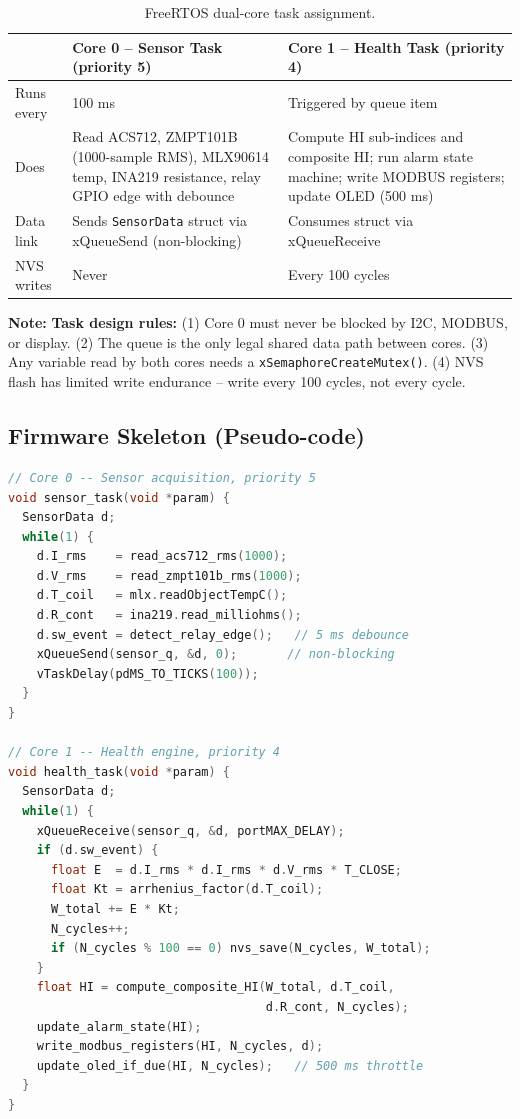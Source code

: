 \documentclass[12pt,a4paper]{article}
\newenvironment{notebox}{%
  \begin{mdframed}[backgroundcolor=notebg,linecolor=noteln,linewidth=1.5pt,
    innerleftmargin=9pt,innerrightmargin=9pt,innertopmargin=5pt,innerbottommargin=5pt]
  \textbf{\color{noteln}Note: }}{\end{mdframed}}
\begin{document}
\begin{table}[H]
\centering
\begin{tabularx}{\textwidth}{lXX}
\toprule
 & \textbf{Core 0 -- Sensor Task (priority 5)} & \textbf{Core 1 -- Health Task (priority 4)} \\
\midrule
Runs every & 100 ms & Triggered by queue item \\
Does & Read ACS712, ZMPT101B (1000-sample RMS), MLX90614 temp, INA219 resistance, relay GPIO edge with debounce & Compute HI sub-indices and composite HI; run alarm state machine; write MODBUS registers; update OLED (500 ms) \\
Data link & Sends \texttt{SensorData} struct via xQueueSend (non-blocking) & Consumes struct via xQueueReceive \\
NVS writes & Never & Every 100 cycles \\
\bottomrule
\end{tabularx}
\caption{FreeRTOS dual-core task assignment.}
\end{table}

\begin{notebox}
\textbf{Task design rules:}
(1) Core 0 must never be blocked by I2C, MODBUS, or display.
(2) The queue is the only legal shared data path between cores.
(3) Any variable read by both cores needs a \texttt{xSemaphoreCreateMutex()}.
(4) NVS flash has limited write endurance -- write every 100 cycles, not every cycle.
\end{notebox}

\subsection{Firmware Skeleton (Pseudo-code)}

\begin{lstlisting}[language=C, caption={FreeRTOS firmware structure.}]
// Core 0 -- Sensor acquisition, priority 5
void sensor_task(void *param) {
  SensorData d;
  while(1) {
    d.I_rms    = read_acs712_rms(1000);
    d.V_rms    = read_zmpt101b_rms(1000);
    d.T_coil   = mlx.readObjectTempC();
    d.R_cont   = ina219.read_milliohms();
    d.sw_event = detect_relay_edge();   // 5 ms debounce
    xQueueSend(sensor_q, &d, 0);       // non-blocking
    vTaskDelay(pdMS_TO_TICKS(100));
  }
}

// Core 1 -- Health engine, priority 4
void health_task(void *param) {
  SensorData d;
  while(1) {
    xQueueReceive(sensor_q, &d, portMAX_DELAY);
    if (d.sw_event) {
      float E  = d.I_rms * d.I_rms * d.V_rms * T_CLOSE;
      float Kt = arrhenius_factor(d.T_coil);
      W_total += E * Kt;
      N_cycles++;
      if (N_cycles % 100 == 0) nvs_save(N_cycles, W_total);
    }
    float HI = compute_composite_HI(W_total, d.T_coil,
                                    d.R_cont, N_cycles);
    update_alarm_state(HI);
    write_modbus_registers(HI, N_cycles, d);
    update_oled_if_due(HI, N_cycles);   // 500 ms throttle
  }
}
\end{lstlisting}
\end{document}
